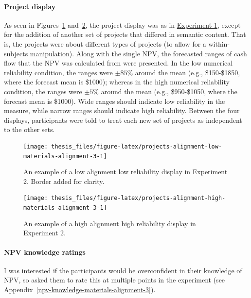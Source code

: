 \documentclass[a4paper, nobind, dvipsnames]{templates/ociamthesis}
\theoremstyle{definition}
\theoremstyle{definition}
\theoremstyle{definition}
\theoremstyle{definition}
\theoremstyle{remark}
\begin{document}
\paragraph{Project display}

As seen in Figures~\ref{fig:projects-alignment-low-materials-alignment-3}
and~\ref{fig:projects-alignment-high-materials-alignment-3}, the project
display was as in \protect\hyperlink{projects-materials-alignment-2}{Experiment 1}, except for
the addition of another set of projects that differed in semantic content. That
is, the projects were about different types of projects (to allow for a
within-subjects manipulation). Along with the single NPV, the forecasted ranges
of cash flow that the NPV was calculated from were presented. In the low
numerical reliability condition, the ranges were \(\pm85\)\% around the mean (e.g.,
\$150-\$1850, where the forecast mean is \$1000); whereas in the high numerical
reliability condition, the ranges were \(\pm5\)\% around the mean (e.g.,
\$950-\$1050, where the forecast mean is \$1000). Wide ranges should indicate low
reliability in the measure, while narrow ranges should indicate high
reliability. Between the four displays, participants were told to treat each new
set of projects as independent to the other sets.



\begin{figure}
\texttt{[image: thesis\_files/figure-latex/projects-alignment-low-materials-alignment-3-1]} \caption{An example of a low alignment low reliability display in Experiment 2. Border added for clarity.}\label{fig:projects-alignment-low-materials-alignment-3}
\end{figure}



\begin{figure}
\texttt{[image: thesis\_files/figure-latex/projects-alignment-high-materials-alignment-3-1]} \caption{An example of a high alignment high reliability display in Experiment 2.}\label{fig:projects-alignment-high-materials-alignment-3}
\end{figure}

\paragraph{NPV knowledge ratings}

I was interested if the participants would be overconfident in their knowledge
of NPV, so asked them to rate this at multiple points in the experiment (see
Appendix~\ref{npv-knowledge-materials-alignment-3}).
\end{document}
